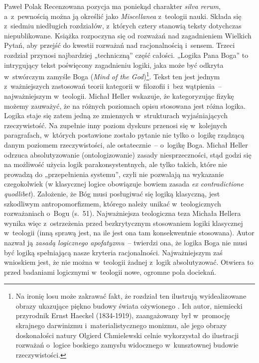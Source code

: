 \begin{recplenv}{Paweł Polak}
Recenzowana pozycja ma poniekąd charakter \textit{silva rerum}, a~z~pewnością
można ją określić jako \textit{Miscellanea} z~teologii nauki. Składa się z~siedmiu
niedługich rozdziałów, z~których cztery stanowią teksty dotychczas niepublikowane. Książka rozpoczyna się od rozważań
nad zagadnieniem Wielkich Pytań, aby przejść do kwestii rozważań nad racjonalnością i~sensem. Trzeci rozdział przynosi
najbardziej „techniczną” część całości. „Logika Pana Boga” to intrygujący tekst poświęcony zagadnieniu logiki, jaka
może być odkryta w~stwórczym zamyśle Boga (\textit{Mind of the God})\footnote{Na
ironię losu może zakrawać fakt, że rozdział ten ilustrują wyidealizowane obrazy ukazujące piękno budowy świata
ożywionego
\parencite{haeckel_kunstformen_1904}.
Ich autor, niemiecki przyrodnik Ernst Haeckel (1834-1919), zaangażowany był w~promocję
skrajnego darwinizmu i~materialistycznego monizmu, ale jego obrazy doskonałości natury Olgierd Chmielewski celnie
wykorzystał do ilustracji rozważań o~logice boskiego zamysłu widocznego w~kunsztownej budowie rzeczywistości.}.
\enlargethispage{1\baselineskip}
Tekst
ten jest jednym z~ważniejszych zastosowań teorii kategorii w~filozofii i~bez wątpienia~-- najważniejszym w~teologii.
Michał Heller wskazuje, że kategoryzując fizykę możemy zauważyć, że na różnych poziomach opisu stosowana jest różna
logika. Logika staje się zatem jedną ze zmiennych w~strukturach wyjaśniających rzeczywistość. Na zupełnie inny poziom
dyskurs przenosi się w~kolejnych paragrafach, w~których postawione zostało pytanie nie tylko o~logikę rządzącą danym
poziomem rzeczywistości, ale ostatecznie~-- o~logikę Boga. Michał Heller odrzuca absolutyzowanie (ontologizowanie)
zasady niesprzeczności, stąd godzi się na możliwość użycia logik parakonsystentnych, ale tylko takich, które nie
prowadzą do „przepełnienia systemu”, czyli nie pozwalają na wykazanie czegokolwiek (w klasycznej logice obowiązuje
bowiem zasada \textit{ex contradictione quodlibet}). Założenie, że Bóg musi
posługiwać się logiką klasyczną, jest szkodliwym antropomorfizmem, którego należy unikać w~teologicznych rozważaniach o~Bogu
(s.~51). Najważniejsza teologiczna teza Michała Hellera wynika więc z~ostrzeżenia przed bezkrytycznym stosowaniem
logiki klasycznej w~teologii (inną sprawą jest, na ile jest ona tam konsekwentnie stosowana). Autor nazwał ją
\textit{zasadą logicznego apofatyzmu}~-- twierdzi ona, że logika Boga nie musi być
logiką spełniającą nasze kryteria racjonalności. Najważniejszym zaś wnioskiem jest, że nie można w~teologii żadnej z~logik
absolutyzować. Otwiera to przed badaniami logicznymi w~teologii nowe, ogromne pola dociekań.


\end{recplenv}
